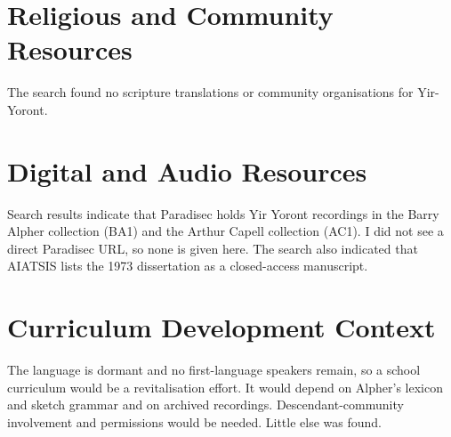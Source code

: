 \documentclass[12pt]{article}
\begin{document}
\section{Religious and Community Resources}
The search found no scripture translations or community organisations for Yir-Yoront.

\section{Digital and Audio Resources}
Search results indicate that Paradisec holds Yir Yoront recordings in the Barry Alpher collection (BA1) and the Arthur Capell collection (AC1). I did not see a direct Paradisec URL, so none is given here. The search also indicated that AIATSIS lists the 1973 dissertation as a closed-access manuscript.

\section{Curriculum Development Context}
The language is dormant and no first-language speakers remain, so a school curriculum would be a revitalisation effort. It would depend on Alpher's lexicon and sketch grammar and on archived recordings. Descendant-community involvement and permissions would be needed. Little else was found.
\end{document}
